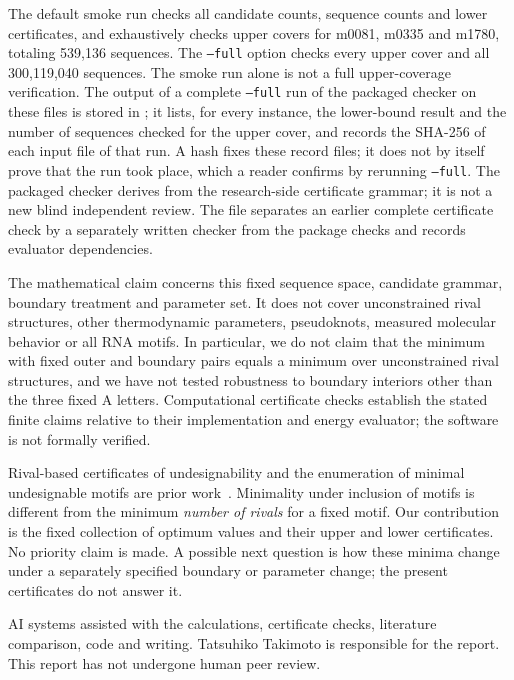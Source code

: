 \documentclass[10pt,a4paper]{article}
\begin{document}
The default smoke run checks all candidate counts, sequence counts and lower certificates, and exhaustively checks upper covers for m0081, m0335 and m1780, totaling 539,136 sequences. The \texttt{--full} option checks every upper cover and all 300,119,040 sequences. The smoke run alone is not a full upper-coverage verification. The output of a complete \texttt{--full} run of the packaged checker on these files is stored in ; it lists, for every instance, the lower-bound result and the number of sequences checked for the upper cover, and  records the SHA-256 of each input file of that run. A hash fixes these record files; it does not by itself prove that the run took place, which a reader confirms by rerunning \texttt{--full}. The packaged checker derives from the research-side certificate grammar; it is not a new blind independent review. The  file separates an earlier complete certificate check by a separately written checker from the package checks and records evaluator dependencies.

The mathematical claim concerns this fixed sequence space, candidate grammar, boundary treatment and parameter set. It does not cover unconstrained rival structures, other thermodynamic parameters, pseudoknots, measured molecular behavior or all RNA motifs. In particular, we do not claim that the minimum with fixed outer and boundary pairs equals a minimum over unconstrained rival structures, and we have not tested robustness to boundary interiors other than the three fixed A letters. Computational certificate checks establish the stated finite claims relative to their implementation and energy evaluator; the software is not formally verified.

Rival-based certificates of undesignability and the enumeration of minimal undesignable motifs are prior work~\cite{rigende,fastmotif,journal}. Minimality under inclusion of motifs is different from the minimum \emph{number of rivals} for a fixed motif. Our contribution is the fixed collection of optimum values and their upper and lower certificates. No priority claim is made. A possible next question is how these minima change under a separately specified boundary or parameter change; the present certificates do not answer it.

AI systems assisted with the calculations, certificate checks, literature comparison, code and writing. Tatsuhiko Takimoto is responsible for the report. This report has not undergone human peer review.
\end{document}

